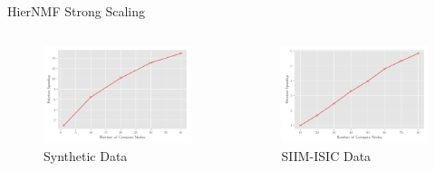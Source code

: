 \documentclass{beamer}
\newcommand{\image}{SIIM-ISIC}
\begin{document}
\begin{frame}{HierNMF Strong Scaling}
    \centering
    \begin{columns}
        \begin{column}{0.5\textwidth}
            \begin{figure}
            \includegraphics[width=\textwidth]{../plots/synthetic_hierarchical_speedup.pdf}
            \caption{Synthetic  Data}
            \end{figure}
        \end{column}
        \begin{column}{0.5\textwidth}
            \begin{figure}
            \includegraphics[width=\textwidth]{../plots/realworld_hierarchical_speedup.pdf}
            \caption{\image{} Data}
            \end{figure}
        \end{column}
    \end{columns}
\end{frame}
\end{document}
